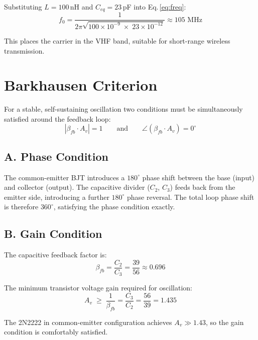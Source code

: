 \documentclass[10pt, twocolumn]{article}
\begin{document}
Substituting $L = 100$\,nH and $C_{eq} = 23$\,pF into Eq.\,\ref{eq:freq}:
\begin{equation}
  f_0 = \frac{1}{2\pi\sqrt{100\times10^{-9}\;\times\;23\times10^{-12}}}
      \approx \boxed{105\text{ MHz}}
\end{equation}

This places the carrier in the VHF band, suitable for short-range
wireless transmission.

\section{Barkhausen Criterion}

For a stable, self-sustaining oscillation two conditions must be simultaneously
satisfied around the feedback loop:
\begin{equation}
  |\beta_{fb} \cdot A_v| = 1
  \qquad\text{and}\qquad
  \angle(\beta_{fb} \cdot A_v) = 0^{\circ}
\end{equation}

\subsection{A. Phase Condition}

The common-emitter BJT introduces a $180^{\circ}$ phase shift between the
base (input) and collector (output). The capacitive divider ($C_2$, $C_3$)
feeds back from the emitter side, introducing a further $180^{\circ}$ phase
reversal. The total loop phase shift is therefore $360^{\circ}$, satisfying
the phase condition exactly.

\subsection{B. Gain Condition}

The capacitive feedback factor is:
\begin{equation}
  \beta_{fb} = \frac{C_2}{C_3} = \frac{39}{56} \approx 0.696
\end{equation}

The minimum transistor voltage gain required for oscillation:
\begin{equation}
  A_v \;\geq\; \frac{1}{\beta_{fb}} = \frac{C_3}{C_2}
             = \frac{56}{39} = 1.435
\end{equation}

The 2N2222 in common-emitter configuration achieves $A_v \gg 1.43$, so the
gain condition is comfortably satisfied.
\end{document}
